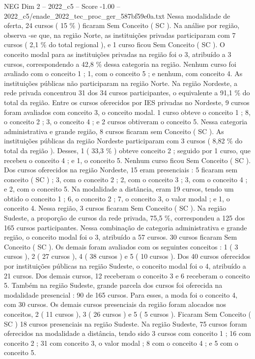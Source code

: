 \begin{textsample}{NEG Dim 2 – 2022\_c5 – Score -1.00 – 2022\_c5/enade\_2022\_tec\_proc\_ger\_587bf59e0a.txt}
Nessa modalidade de oferta, 24 cursos ( 15 \% ) ficaram Sem Conceito ( SC ).
Na análise por região, observa -se que, na região Norte, as instituições privadas participaram com 7 cursos ( 2,1 \% do total regional ), e 1 curso ficou Sem Conceito ( SC ).
O conceito modal para as instituições privadas na região foi o 3, atribuído a 3 cursos, correspondendo a 42,8 \% dessa categoria na região.
Nenhum curso foi avaliado com o conceito 1 ; 1, com o conceito 5 ; e nenhum, com conceito 4.
As instituições públicas não participaram na região Norte.
Na região Nordeste, a rede privada concentrou 31 dos 34 cursos participantes, o equivalente a 91,1 \% do total da região.
Entre os cursos oferecidos por IES privadas no Nordeste, 9 cursos foram avaliados com conceito 3, o conceito modal. 1 curso obteve o conceito 1 ; 8, o conceito 2 ; 3, o conceito 4 ; e 2 cursos obtiveram o conceito 5.
Nessa categoria administrativa e grande região, 8 cursos ficaram sem Conceito ( SC ).
As instituições públicas da região Nordeste participaram com 3 cursos ( 8,82 \% do total da região ).
Desses, 1 ( 33,3 \% ) obteve conceito 2 ; seguido por 1 curso, que recebeu o conceito 4 ; e 1, o conceito 5.
Nenhum curso ficou Sem Conceito ( SC ).
Dos cursos oferecidos na região Nordeste, 15 eram presenciais : 5 ficaram sem conceito ( SC ) ; 3, com o conceito 2 ; 2, com o conceito 3 ; 3, com o conceito 4 ; e 2, com o conceito 5.
Na modalidade a distância, eram 19 cursos, tendo um obtido o conceito 1 ; 6, o conceito 2 ; 7, o conceito 3, o valor modal ; e 1, o conceito 4.
Nessa região, 3 cursos ficaram Sem Conceito ( SC ).
Na região Sudeste, a proporção de cursos da rede privada, 75,5 \%, correspondeu a 125 dos 165 cursos participantes.
Nessa combinação de categoria administrativa e grande região, o conceito modal foi o 3, atribuído a 57 cursos. 30 cursos ficaram Sem Conceito ( SC ).
Os demais foram avaliados com os seguintes conceitos : 1 ( 3 cursos ), 2 ( 27 cursos ), 4 ( 38 cursos ) e 5 ( 10 cursos ).
Dos 40 cursos oferecidos por instituições públicas na região Sudeste, o conceito modal foi o 4, atribuído a 21 cursos.
Dos demais cursos, 12 receberam o conceito 3 e 6 receberam o conceito 5.
Também na região Sudeste, grande parcela dos cursos foi oferecida na modalidade presencial : 90 de 165 cursos.
Para esses, a moda foi o conceito 4, com 30 cursos.
Os demais cursos presenciais da região foram alocados nos conceitos, 2 ( 11 cursos ), 3 ( 26 cursos ) e 5 ( 5 cursos ).
Ficaram Sem Conceito ( SC ) 18 cursos presenciais na região Sudeste.
Na região Sudeste, 75 cursos foram oferecidos na modalidade a distância, tendo sido 3 cursos com conceito 1 ; 16 com conceito 2 ; 31 com conceito 3, o valor modal ; 8 com o conceito 4 ; e 5 com o conceito 5.

\end{textsample}
